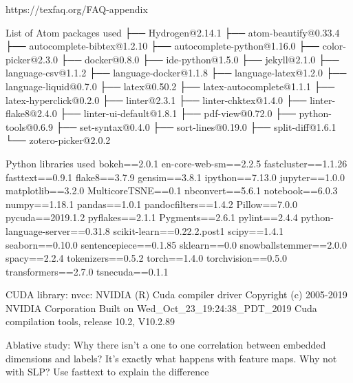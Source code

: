 
https://texfaq.org/FAQ-appendix

List of Atom packages used
├── Hydrogen@2.14.1
├── atom-beautify@0.33.4
├── autocomplete-bibtex@1.2.10
├── autocomplete-python@1.16.0
├── color-picker@2.3.0
├── docker@0.8.0
├── ide-python@1.5.0
├── jekyll@2.1.0
├── language-csv@1.1.2
├── language-docker@1.1.8
├── language-latex@1.2.0
├── language-liquid@0.7.0
├── latex@0.50.2
├── latex-autocomplete@1.1.1
├── latex-hyperclick@0.2.0
├── linter@2.3.1
├── linter-chktex@1.4.0
├── linter-flake8@2.4.0
├── linter-ui-default@1.8.1
├── pdf-view@0.72.0
├── python-tools@0.6.9
├── set-syntax@0.4.0
├── sort-lines@0.19.0
├── split-diff@1.6.1
└── zotero-picker@2.0.2


Python libraries used
bokeh==2.0.1
en-core-web-sm==2.2.5
fastcluster==1.1.26
fasttext==0.9.1
flake8==3.7.9
gensim==3.8.1
ipython==7.13.0
jupyter==1.0.0
matplotlib==3.2.0
MulticoreTSNE==0.1
nbconvert==5.6.1
notebook==6.0.3
numpy==1.18.1
pandas==1.0.1
pandocfilters==1.4.2
Pillow==7.0.0
pycuda==2019.1.2
pyflakes==2.1.1
Pygments==2.6.1
pylint==2.4.4
python-language-server==0.31.8
scikit-learn==0.22.2.post1
scipy==1.4.1
seaborn==0.10.0
sentencepiece==0.1.85
sklearn==0.0
snowballstemmer==2.0.0
spacy==2.2.4
tokenizers==0.5.2
torch==1.4.0
torchvision==0.5.0
transformers==2.7.0
tsnecuda==0.1.1


CUDA library:
nvcc: NVIDIA (R) Cuda compiler driver
Copyright (c) 2005-2019 NVIDIA Corporation
Built on Wed_Oct_23_19:24:38_PDT_2019
Cuda compilation tools, release 10.2, V10.2.89


Ablative study: Why there isn't a one to one correlation between embedded dimensions and labels?
It's exactly what happens with feature maps. Why not with SLP? Use fasttext to explain the difference



